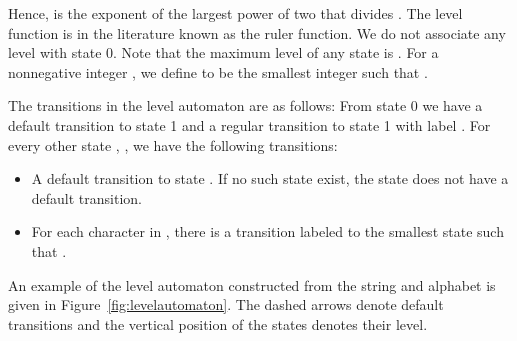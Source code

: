\documentclass[a4paper,11pt]{article}
\begin{document}
Hence,  is the exponent of the largest power of two that divides . The level function is in the literature known as the ruler function. 
We do not associate any level with state 0. Note that the maximum level of any state is .
For a nonnegative integer , we define  to be the smallest integer  such that . 

The transitions in the level automaton are as follows:
From state 0 we have a default transition to state 1 and a regular transition to state 1 with label . For every other state , , we have the following transitions:
\begin{itemize}
\item A default transition to state . If no such state exist, the state  does not have a default transition.
\item For each character  in , there is a transition labeled  to the smallest state  such that .
\end{itemize}
An example of the level automaton constructed from the string  and alphabet  is given in Figure~\ref{fig:levelautomaton}. The dashed arrows denote default transitions and the vertical position of the states denotes their level.
\end{document}
